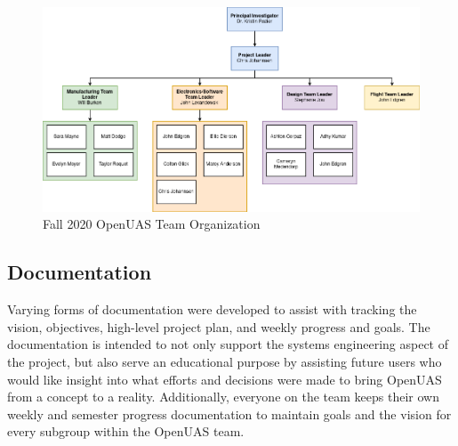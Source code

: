 \documentclass{article}
\begin{document}
\begin{landscape}
\begin{figure}[hbt!]
\centering
\includegraphics[scale=0.6]{Images/openuas_team_org.png}
\caption{Fall 2020 OpenUAS Team Organization}
\label{fig:UAS_team_org}
\end{figure}
\end{landscape}

\newpage

\subsection{Documentation}
Varying forms of documentation were developed to assist with tracking the vision, objectives, high-level project plan, and weekly progress and goals. The documentation is intended to not only support the systems engineering aspect of the project, but also serve an educational purpose by assisting future users who would like insight into what efforts and decisions were made to bring OpenUAS from a concept to a reality. Additionally, everyone on the team keeps their own weekly and semester progress documentation to maintain goals and the vision for every subgroup within the OpenUAS team. \\
\end{document}

